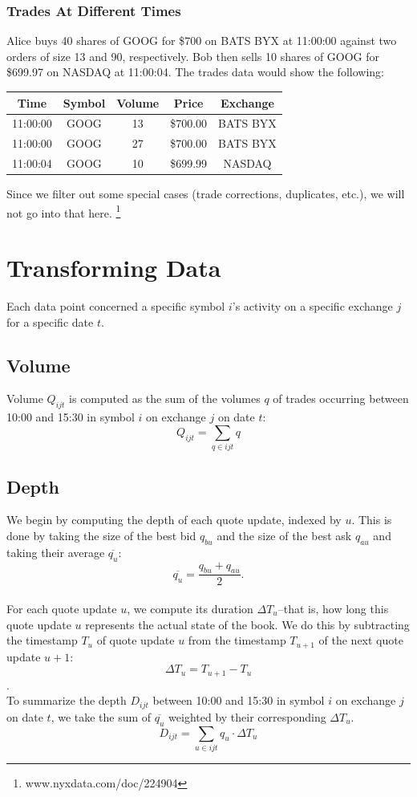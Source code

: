 \documentclass{article}
\begin{document}
\subsubsection{Trades At Different Times}
Alice buys 40 shares of GOOG for \$700 on BATS BYX at 11:00:00 against two orders of size 13 and 90, respectively. Bob then sells 10 shares of GOOG for \$699.97 on NASDAQ at 11:00:04. The trades data would show the following:
\begin{center}
  \begin{tabular}{| c | c | c | c | c |}
    \hline
    Time & Symbol & Volume & Price & Exchange \\ \hline
    11:00:00 & GOOG & 13 & \$700.00 & BATS BYX \\ \hline
    11:00:00 & GOOG & 27 & \$700.00 & BATS BYX \\ \hline
    11:00:04 & GOOG & 10 & \$699.99 & NASDAQ \\ 
    \hline
  \end{tabular}
\end{center}

Since we filter out some special cases (trade corrections, duplicates, etc.), we will not go into that here.
\footnote{www.nyxdata.com/doc/224904}

\section{Transforming Data}
Each data point concerned a specific symbol $i$'s activity on a specific exchange $j$ for a specific date $t$.

\subsection{Volume}
Volume $Q_{ijt}$ is computed as the sum of the volumes $q$ of trades occurring between 10:00 and 15:30 in symbol $i$ on exchange $j$ on date $t$:\\
$$Q_{ijt} = \sum_{q \in ijt} q$$

\subsection{Depth}
We begin by computing the depth of each quote update, indexed by $u$. This is done by taking the size of the best bid $q_{bu}$ and the size of the best ask $q_{au}$ and taking their average $\overline{q_u}$:\\
$$\overline{q_u} = \frac{q_{bu} + q_{au}}{2}.$$\\
For each quote update $u$, we compute its duration $\Delta T_u$--that is, how long this quote update $u$ represents the actual state of the book. We do this by subtracting the timestamp $T_u$ of quote update $u$ from the timestamp $T_{u+1}$ of the next quote update $u+1$:\\
$$\Delta T_u = T_{u+1} - T_u$$.\\
To summarize the depth $D_{ijt}$ between 10:00 and 15:30 in symbol $i$ on exchange $j$ on date $t$, we take the sum of $\overline{q_u}$ weighted by their corresponding $\Delta T_u$.\\
$$D_{ijt} = \sum_{u \in ijt} q_u \cdot\Delta T_u$$
\end{document}
